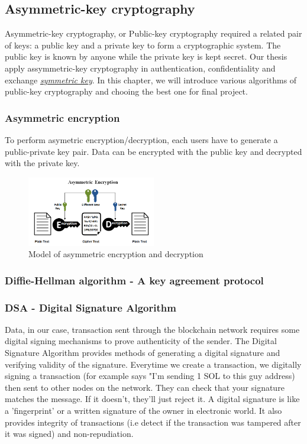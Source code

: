 \subsection{Asymmetric-key cryptography}
\label{sec:asymmetric_cryptography}
Asymmetric-key cryptography, or Public-key cryptography required a related pair of keys: a public key and a private key to form a cryptographic system.
The public key is known by anyone while the private key is kept secret. Our thesis apply assymmetric-key cryptography in authentication, confidentiality and exchange \emph{\hyperref[sec: Symmetric_keys]{symmetric key}}.
In this chapter, we will introduce various algorithms of public-key cryptography and chooing the best one for final project.
	
\subsubsection{Asymmetric encryption}
To perform asymetric encryption/decryption, each users have to generate a public-private key pair.
Data can be encrypted with the public key and decrypted with the private key. 

\begin{figure}[h!]
	\centering
	\includegraphics[width=0.5\textwidth]{images/asymmetric_encrypt.png}
	\caption[Model of asymmetric encryption and decryption]{Model of asymmetric encryption and decryption}
	\label{fig:asymmetric_encrypt}
\end{figure}

\subsubsection{Diffie-Hellman algorithm - A key agreement protocol}


\subsubsection{DSA - Digital Signature Algorithm}
Data, in our case, transaction sent through the blockchain network requires some digital signing mechanisms to prove authenticity of the sender.
The Digital Signature Algorithm provides methods of generating a digital signature and verifying validity of the signature.
Everytime we create a transaction, we digitally signing a transaction (for example says "I'm sending 1 SOL to this guy address) then sent to other nodes on the network. 
They can check that your signature matches the message. If it doesn’t, they’ll just reject it.
A digital signature is like a 'fingerprint' or a written signature of the owner in electronic world. 
It also provides integrity of transactions (i.e detect if the transaction was tampered after it was signed) and non-repudiation.

